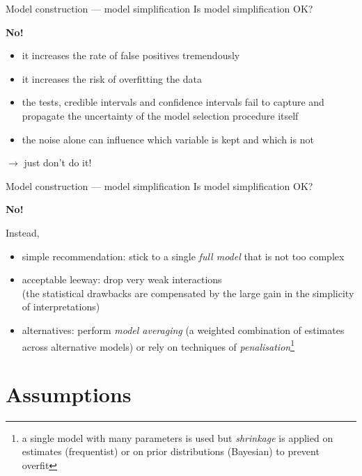 \documentclass[
  10pt,
  ignorenonframetext,
  aspectratio=169,
  t]{beamer}
\providecommand{\tightlist}{%
  \setlength{\itemsep}{0pt}\setlength{\parskip}{0pt}}
\newcommand{\bluenorm}[1]{\textcolor{bluebeamer}{#1}}
\newcommand{\blueit}[1]{\textcolor{bluebeamer}{\emph{#1}}}
\newcommand{\bluebold}[1]{\textcolor{bluebeamer}{\textbf{#1}}}
\begin{document}
\begin{frame}{Model construction --- model simplification}
\protect{}\label{model-construction-model-simplification-1}
Is model simplification OK?

\pause

\bluebold{No!}

\begin{itemize}
\tightlist
\item
  it increases the rate of false positives tremendously
\item
  it increases the risk of overfitting the data
\item
  the tests, credible intervals and confidence intervals fail to capture
  and propagate the uncertainty of the model selection procedure itself
\item
  the noise alone can influence which variable is kept and which is not
\end{itemize}

\(\rightarrow\) just don't do it!
\end{frame}

\begin{frame}{Model construction --- model simplification}
\protect{}\label{model-construction-model-simplification-2}
Is model simplification OK?

\bluebold{No!}

Instead,

\begin{itemize}
\tightlist
\item
  \bluenorm{simple recommendation:} stick to a single
  \blueit{full model} that is not too complex
\item
  \bluenorm{acceptable leeway:} drop very weak interactions\\
  (the statistical drawbacks are compensated by the large gain in the
  simplicity of interpretations)
\item
  \bluenorm{alternatives:} perform \blueit{model averaging} (a weighted
  combination of estimates across alternative models) or rely on
  techniques of
  \blueit{penalisation}\footnote{a single model with many parameters is used but \blueit{shrinkage} is applied on estimates (frequentist) or on prior distributions (Bayesian) to prevent overfit}
\end{itemize}
\end{frame}

\section{Assumptions}\label{assumptions}
\end{document}
